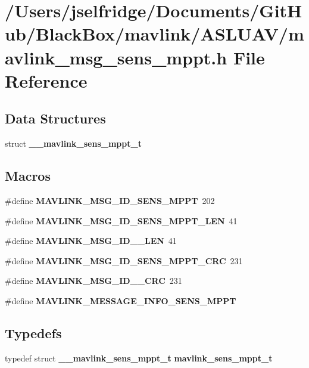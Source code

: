 \section{/\+Users/jselfridge/\+Documents/\+Git\+Hub/\+Black\+Box/mavlink/\+A\+S\+L\+U\+A\+V/mavlink\+\_\+msg\+\_\+sens\+\_\+mppt.h File Reference}
\label{mavlink__msg__sens__mppt_8h}
\subsection*{Data Structures}
\begin{DoxyCompactItemize}
\item 
struct \textbf{ \+\_\+\+\_\+mavlink\+\_\+sens\+\_\+mppt\+\_\+t}
\end{DoxyCompactItemize}
\subsection*{Macros}
\begin{DoxyCompactItemize}
\item 
\#define \textbf{ M\+A\+V\+L\+I\+N\+K\+\_\+\+M\+S\+G\+\_\+\+I\+D\+\_\+\+S\+E\+N\+S\+\_\+\+M\+P\+PT}~202
\item 
\#define \textbf{ M\+A\+V\+L\+I\+N\+K\+\_\+\+M\+S\+G\+\_\+\+I\+D\+\_\+\+S\+E\+N\+S\+\_\+\+M\+P\+P\+T\+\_\+\+L\+EN}~41
\item 
\#define \textbf{ M\+A\+V\+L\+I\+N\+K\+\_\+\+M\+S\+G\+\_\+\+I\+D\+\_\+\_\+\+L\+EN}~41
\item 
\#define \textbf{ M\+A\+V\+L\+I\+N\+K\+\_\+\+M\+S\+G\+\_\+\+I\+D\+\_\+\+S\+E\+N\+S\+\_\+\+M\+P\+P\+T\+\_\+\+C\+RC}~231
\item 
\#define \textbf{ M\+A\+V\+L\+I\+N\+K\+\_\+\+M\+S\+G\+\_\+\+I\+D\+\_\+\_\+\+C\+RC}~231
\item 
\#define \textbf{ M\+A\+V\+L\+I\+N\+K\+\_\+\+M\+E\+S\+S\+A\+G\+E\+\_\+\+I\+N\+F\+O\+\_\+\+S\+E\+N\+S\+\_\+\+M\+P\+PT}
\end{DoxyCompactItemize}
\subsection*{Typedefs}
\begin{DoxyCompactItemize}
\item 
typedef struct \textbf{ \+\_\+\+\_\+mavlink\+\_\+sens\+\_\+mppt\+\_\+t} \textbf{ mavlink\+\_\+sens\+\_\+mppt\+\_\+t}
\end{DoxyCompactItemize}


